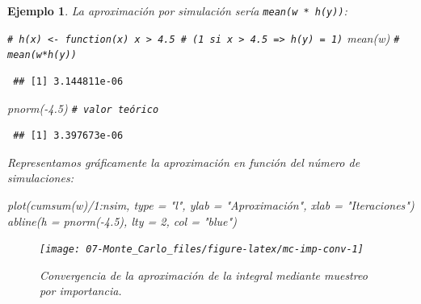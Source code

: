 \documentclass[
]{book}
\newenvironment{Shaded}{\begin{snugshade}}{\end{snugshade}}
\newcommand{\AttributeTok}[1]{\textcolor[rgb]{0.77,0.63,0.00}{#1}}
\newcommand{\CommentTok}[1]{\textcolor[rgb]{0.56,0.35,0.01}{\textit{#1}}}
\newcommand{\DecValTok}[1]{\textcolor[rgb]{0.00,0.00,0.81}{#1}}
\newcommand{\FloatTok}[1]{\textcolor[rgb]{0.00,0.00,0.81}{#1}}
\newcommand{\FunctionTok}[1]{\textcolor[rgb]{0.00,0.00,0.00}{#1}}
\newcommand{\NormalTok}[1]{#1}
\newcommand{\SpecialCharTok}[1]{\textcolor[rgb]{0.00,0.00,0.00}{#1}}
\newcommand{\StringTok}[1]{\textcolor[rgb]{0.31,0.60,0.02}{#1}}
\theoremstyle{break}
\newtheorem{example}{Ejemplo}[chapter]
\theoremstyle{nonumberplain}
\renewcommand{\CommentTok}[1]{\textcolor[rgb]{0.41,0.41,0.41}{\texttt{#1}}}
\begin{document}
\begin{example}
La aproximación por simulación sería \texttt{mean(w\ *\ h(y))}:

\begin{Shaded}
\begin{Highlighting}[]
\CommentTok{\# h(x) \textless{}{-} function(x) x \textgreater{} 4.5  \# (1 si x \textgreater{} 4.5 =\textgreater{} h(y) = 1)}
\FunctionTok{mean}\NormalTok{(w) }\CommentTok{\# mean(w*h(y))}
\end{Highlighting}
\end{Shaded}

\begin{verbatim}
 ## [1] 3.144811e-06
\end{verbatim}

\begin{Shaded}
\begin{Highlighting}[]
\FunctionTok{pnorm}\NormalTok{(}\SpecialCharTok{{-}}\FloatTok{4.5}\NormalTok{)  }\CommentTok{\# valor teórico}
\end{Highlighting}
\end{Shaded}

\begin{verbatim}
 ## [1] 3.397673e-06
\end{verbatim}

Representamos gráficamente la aproximación en función del número de simulaciones:

\begin{Shaded}
\begin{Highlighting}[]
\FunctionTok{plot}\NormalTok{(}\FunctionTok{cumsum}\NormalTok{(w)}\SpecialCharTok{/}\DecValTok{1}\SpecialCharTok{:}\NormalTok{nsim, }\AttributeTok{type =} \StringTok{"l"}\NormalTok{, }\AttributeTok{ylab =} \StringTok{"Aproximación"}\NormalTok{, }\AttributeTok{xlab =} \StringTok{"Iteraciones"}\NormalTok{)}
\FunctionTok{abline}\NormalTok{(}\AttributeTok{h =} \FunctionTok{pnorm}\NormalTok{(}\SpecialCharTok{{-}}\FloatTok{4.5}\NormalTok{), }\AttributeTok{lty =} \DecValTok{2}\NormalTok{, }\AttributeTok{col =} \StringTok{"blue"}\NormalTok{)}
\end{Highlighting}
\end{Shaded}

\begin{figure}[!htb]

{\centering \texttt{[image: 07-Monte\_Carlo\_files/figure-latex/mc-imp-conv-1]} 

}

\caption{Convergencia de la aproximación de la integral mediante muestreo por importancia.}\label{fig:mc-imp-conv}
\end{figure}


\end{example}
\end{document}
